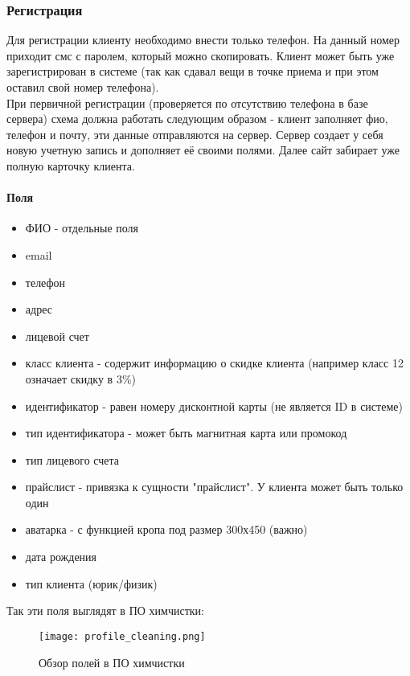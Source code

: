 \documentclass[DIV=calc, paper=a4, fontsize=11pt]{scrartcl} %
\begin{document}
\subsubsection{Регистрация}
Для регистрации клиенту необходимо внести только телефон. На данный номер приходит смс с паролем, который можно скопировать. Клиент может быть уже зарегистрирован в системе (так как сдавал вещи в точке приема и при этом оставил свой номер телефона).
\\[0.5cm]
При первичной регистрации (проверяется по отсутствию телефона в базе сервера) схема должна работать следующим образом - клиент заполняет фио, телефон и почту, эти данные отправляются на сервер. Сервер создает у себя новую учетную запись и дополняет её своими полями. Далее сайт забирает уже полную карточку клиента.

\paragraph{Поля}
\begin{itemize}
	\item ФИО - отдельные поля
	\item email
	\item телефон
	\item адрес
	\item лицевой счет
	\item класс клиента - содержит информацию о скидке клиента (например класс 12 означает скидку в 3\%)
	\item идентификатор - равен номеру дисконтной карты (не является ID в системе)
	\item тип идентификатора - может быть магнитная карта или промокод
	\item тип лицевого счета
	\item прайслист - привязка к сущности "прайслист". У клиента может быть только один
	\item аватарка - с функцией кропа под размер 300х450 (важно)
	\item дата рождения
	\item тип клиента (юрик/физик)
\end{itemize}

Так эти поля выглядят в ПО химчистки:

	\begin{figure}[H]
        \centering
        \texttt{[image: profile\_cleaning.png]}
        \caption{Обзор полей в ПО химчистки\label{fig:profile_cleaning.png}}
    \end{figure}
    
\end{document}
